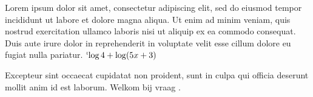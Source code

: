 \documentclass[a4paper,12pt]{extarticle}
\begin{document}

\ifmaketheformulapage
  \makeformulapage
\fi

\makeatletter\ifOptExc@firstexconnewpage
  \setmainpagegeometry
\fi\makeatother

 \label{exc:lorem}


Lorem ipsum dolor sit amet, consectetur adipiscing elit, sed do eiusmod tempor incididunt ut labore et dolore magna aliqua. Ut enim ad minim veniam, quis nostrud exercitation ullamco laboris nisi ut aliquip ex ea commodo consequat.
Duis aute irure dolor in reprehenderit in voluptate velit esse cillum dolore eu fugiat nulla pariatur. $\lognl[4] 4 + \lognl(5x+3)$

Excepteur sint occaecat cupidatat non proident, sunt in culpa qui officia deserunt mollit anim id est laborum. Welkom bij vraag .\newline

 \label{q:vraag}
\end{document}
